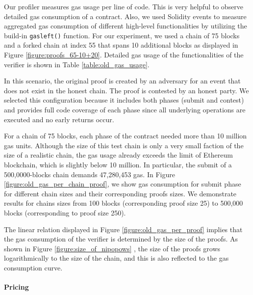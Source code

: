 Our profiler measures gas usage per line of code. This is very helpful to
observe detailed gas consumption of a contract. Also, we used Solidity events
to measure aggregated gas consumption of different high-level functionalities
by utilizing the build-in \texttt{gasleft()} function. For our experiment, we
used a chain of 75 blocks and a forked chain at index 55 that spans 10
additional blocks as displayed in Figure \ref{figure:proofs_65-10+20}. Detailed
gas usage of the functionalities of the verifier is shown in Table
\ref{table:old_gas_usage}.




In this scenario, the original proof is created by an adversary for an event
that does not exist in the honest chain. The proof is contested by an honest
party. We selected this configuration because it includes both phases
(submit and contest) and provides full code coverage of each phase since all
underlying operations are executed and no early returns occur.

For a chain of 75 blocks, each phase of the contract needed more than 10
million gas units. Although the size of this test chain is only a very small
faction of the size of a realistic chain, the gas usage already exceeds the
limit of Ethereum blockchain, which is slightly below 10 million. In
particular, the submit of a 500,0000-blocks chain demands 47,280,453 gas. In
Figure \ref{figure:old_gas_per_chain_proof}, we show gas consumption for submit
phase for different chain sizes and their corresponding proofs sizes. We
demonstrate results for chains sizes from 100 blocks (corresponding proof size
25) to 500,000 blocks (corresponding to proof size 250).

The linear relation displayed in Figure \ref{figure:old_gas_per_proof} implies
that the gas consumption of the verifier is determined by the size of the
proofs. As shown in Figure \ref{figure:size_of_nipopows} , the size of the
proofs grows logarithmically to the size of the chain, and this is also
reflected to the gas consumption curve.





\paragraph{Pricing}

